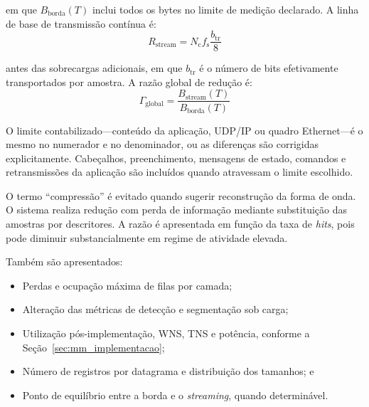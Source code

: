 \noindent
em que \(B_{\mathrm{borda}}(T)\) inclui todos os bytes no limite de medição declarado. A linha de base de transmissão contínua é:
\begin{equation}
	R_{\mathrm{stream}} = N_{\mathrm{c}} f_{\mathrm{s}}\frac{b_{\mathrm{tr}}}{8}
	\label{v2:eq:taxa_stream_resultados}
\end{equation}

\noindent
antes das sobrecargas adicionais, em que \(b_{\mathrm{tr}}\) é o número de bits efetivamente transportados por amostra. A razão global de redução é:
\begin{equation}
	\Gamma_{\mathrm{global}} = \frac{B_{\mathrm{stream}}(T)}{B_{\mathrm{borda}}(T)}
	\label{v2:eq:razao_reducao_global_resultados}
\end{equation}

O limite contabilizado---conteúdo da aplicação, UDP/IP ou quadro Ethernet---é o mesmo no numerador e no denominador, ou as diferenças são corrigidas explicitamente. Cabeçalhos, preenchimento, mensagens de estado, comandos e retransmissões da aplicação são incluídos quando atravessam o limite escolhido.

O termo ``compressão'' é evitado quando sugerir reconstrução da forma de onda. O sistema realiza redução com perda de informação mediante substituição das amostras por descritores. A razão é apresentada em função da taxa de \textit{hits}, pois pode diminuir substancialmente em regime de atividade elevada.

Também são apresentados:
\begin{itemize}
	\item Perdas e ocupação máxima de filas por camada;
	
	\item Alteração das métricas de detecção e segmentação sob carga;
	
	\item Utilização pós-implementação, WNS, TNS e potência, conforme a Seção~\ref{sec:mm_implementacao};
	
	\item Número de registros por datagrama e distribuição dos tamanhos; e
	
	\item Ponto de equilíbrio entre a borda e o \textit{streaming}, quando determinável.
\end{itemize}


